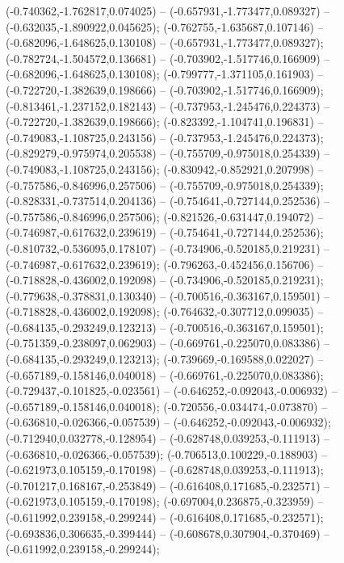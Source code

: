 (-0.740362,-1.762817,0.074025) -- (-0.657931,-1.773477,0.089327) -- (-0.632035,-1.890922,0.045625);
 (-0.762755,-1.635687,0.107146) -- (-0.682096,-1.648625,0.130108) -- (-0.657931,-1.773477,0.089327);
 (-0.782724,-1.504572,0.136681) -- (-0.703902,-1.517746,0.166909) -- (-0.682096,-1.648625,0.130108);
 (-0.799777,-1.371105,0.161903) -- (-0.722720,-1.382639,0.198666) -- (-0.703902,-1.517746,0.166909);
 (-0.813461,-1.237152,0.182143) -- (-0.737953,-1.245476,0.224373) -- (-0.722720,-1.382639,0.198666);
 (-0.823392,-1.104741,0.196831) -- (-0.749083,-1.108725,0.243156) -- (-0.737953,-1.245476,0.224373);
 (-0.829279,-0.975974,0.205538) -- (-0.755709,-0.975018,0.254339) -- (-0.749083,-1.108725,0.243156);
 (-0.830942,-0.852921,0.207998) -- (-0.757586,-0.846996,0.257506) -- (-0.755709,-0.975018,0.254339);
 (-0.828331,-0.737514,0.204136) -- (-0.754641,-0.727144,0.252536) -- (-0.757586,-0.846996,0.257506);
 (-0.821526,-0.631447,0.194072) -- (-0.746987,-0.617632,0.239619) -- (-0.754641,-0.727144,0.252536);
 (-0.810732,-0.536095,0.178107) -- (-0.734906,-0.520185,0.219231) -- (-0.746987,-0.617632,0.239619);
 (-0.796263,-0.452456,0.156706) -- (-0.718828,-0.436002,0.192098) -- (-0.734906,-0.520185,0.219231);
 (-0.779638,-0.378831,0.130340) -- (-0.700516,-0.363167,0.159501) -- (-0.718828,-0.436002,0.192098);
 (-0.764632,-0.307712,0.099035) -- (-0.684135,-0.293249,0.123213) -- (-0.700516,-0.363167,0.159501);
 (-0.751359,-0.238097,0.062903) -- (-0.669761,-0.225070,0.083386) -- (-0.684135,-0.293249,0.123213);
 (-0.739669,-0.169588,0.022027) -- (-0.657189,-0.158146,0.040018) -- (-0.669761,-0.225070,0.083386);
 (-0.729437,-0.101825,-0.023561) -- (-0.646252,-0.092043,-0.006932) -- (-0.657189,-0.158146,0.040018);
 (-0.720556,-0.034474,-0.073870) -- (-0.636810,-0.026366,-0.057539) -- (-0.646252,-0.092043,-0.006932);
 (-0.712940,0.032778,-0.128954) -- (-0.628748,0.039253,-0.111913) -- (-0.636810,-0.026366,-0.057539);
 (-0.706513,0.100229,-0.188903) -- (-0.621973,0.105159,-0.170198) -- (-0.628748,0.039253,-0.111913);
 (-0.701217,0.168167,-0.253849) -- (-0.616408,0.171685,-0.232571) -- (-0.621973,0.105159,-0.170198);
 (-0.697004,0.236875,-0.323959) -- (-0.611992,0.239158,-0.299244) -- (-0.616408,0.171685,-0.232571);
 (-0.693836,0.306635,-0.399444) -- (-0.608678,0.307904,-0.370469) -- (-0.611992,0.239158,-0.299244);
